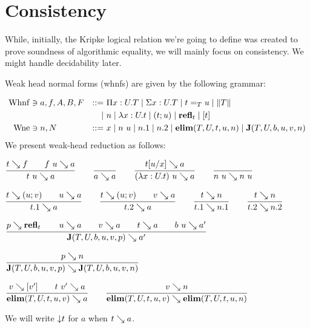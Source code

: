 \documentclass[a4paper,english]{lipics-utf8x}
\begin{document}
  \section{Consistency}

  While, initially, the Kripke logical relation we're going to define was
  created to prove soundness of algorithmic equality, we will mainly focus
  on consistency. We might handle decidability later.


  Weak head normal forms (whnfs) are given by the following grammar:

  \begin{align*}
    \operatorname{Whnf} &\ni a,f,A,B,F &::=~& \Pi x:U.T \mid \Sigma x:U.T \mid t =_T u
                           \mid \|T\| \\
        &&\mid~& n \mid \lambda x:U.t \mid (t;u) \mid \operatorname{\mathbf{refl}}_t \mid [t] \\
    \operatorname{Wne}  &\ni n,N &::=~& x \mid n~u \mid n.1 \mid n.2 \mid \operatorname{\mathbf{elim}}(T,U,t,u,n)
                           \mid \operatorname{\mathbf{J}} (T,U,b,u,v,n)
  \end{align*}
  We present weak-head reduction as follows:

  \begin{center}
  \(
    \ru{t \rew f \qquad
        f~u \rew a
      }{t~u \rew a}
    \qquad
    \ru{}{a \rew a}
    \qquad
    \ru{t[u/x] \rew a
      }{(\lambda x:U.t)~u \rew a}
    \qquad
    \ru{}{n~u \rew n~u}
  \)
  \end{center}

  \begin{center}
  \(
    \ru{t \rew (u;v) \qquad
        u \rew a
      }{t.1 \rew a}
    \qquad
    \ru{t \rew (u;v) \qquad
        v \rew a
      }{t.2 \rew a}
    \qquad
    \ru{t \rew n
      }{t.1 \rew n.1}
    \qquad
    \ru{t \rew n
      }{t.2 \rew n.2}
  \)
  \end{center}

  \begin{center}
  \(
    \ru{p \rew \refl_t \qquad
        u \rew a \qquad
        v \rew a \qquad
        t \rew a \qquad
        b\ u \rew a'
      }{\J (T,U,b,u,v,p) \rew a'}
  \)
  \end{center}

  \begin{center}
  \(
    \ru{p \rew n
      }{\J (T,U,b,u,v,p) \rew \J (T,U,b,u,v,n)}
  \)
  \end{center}

  \begin{center}
  \(
    \ru{v \rew [v'] \qquad
        t\ v' \rew a
      }{\elim(T,U,t,u,v) \rew a}
    \qquad
    \ru{v \rew n
      }{\elim(T,U,t,u,v) \rew \elim(T,U,t,u,n)}
  \)
  \end{center}
  We will write ${\downarrow} t$ for $a$ when $t \searrow a$.
\end{document}
